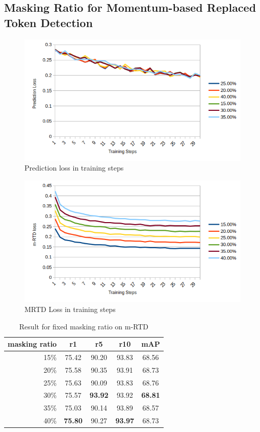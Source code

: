 \subsection{Masking Ratio for Momentum-based Replaced Token Detection}

\begin{figure}
    \includegraphics[width=\linewidth]{img/mrtd_prd_loss.png}
    \caption{Prediction loss in training steps}
    \label{img:mrtd_prd_loss}
\end{figure}

\begin{figure}
    \includegraphics[width=\linewidth]{img/mrtd_loss.png}
    \caption{MRTD Loss in training steps}
    \label{img:mrtd_loss}
\end{figure}

\begin{table}[htbp]
  \centering
  \caption{Result for fixed masking ratio on m-RTD}
  \begin{tabular}{rcccc}
    masking ratio & r1 & r5 & r10 & mAP \\ \hline
    15\% & 75.42 & 90.20 & 93.83 & 68.56 \\
    20\% & 75.58 & 90.35 & 93.91 & 68.73 \\
    25\% & 75.63 & 90.09 & 93.83 & 68.76 \\
    30\% & 75.57 & \textbf{93.92} & 93.92 & \textbf{68.81} \\
    35\% & 75.03 & 90.14 & 93.89 & 68.57 \\
    40\% & \textbf{75.80} & 90.27 & \textbf{93.97} & 68.73
  \end{tabular}
\end{table}

